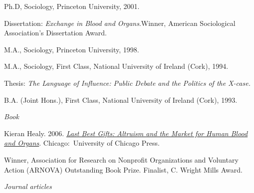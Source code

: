 \documentclass[11pt,article,oneside]{memoir}
\begin{document}

\ind Ph.D, Sociology, Princeton University, 2001.

\ind \hspace{0.35in} \footnotesize Dissertation: \emph{Exchange in Blood and Organs}.\newline Winner, American Sociological Association's Dissertation Award.\normalsize \vspace{0.05in}

\ind M.A., Sociology, Princeton University, 1998. 


\ind M.A., Sociology, First Class, National University of Ireland (Cork), 1994.

\ind \hspace{0.35in} \footnotesize Thesis: \emph{The Language of Influence: Public Debate and the Politics of the X-case.} \normalsize \vspace{0.01in}

\ind B.A. (Joint Hons.), First Class, National University of Ireland (Cork), 1993.

\bigskip
 
\medskip
\noindent\emph{Book \vspace{0.01in}}

\ind  Kieran Healy. 2006. \emph{\href{http://www.lastbestgifts.com}{Last Best Gifts: Altruism and the Market for Human Blood and Organs}}. Chicago:~University of Chicago Press. \vspace{0.05in}

\ind \hspace{0.35in} \footnotesize Winner, Association for Research on Nonprofit Organizations and Voluntary Action (ARNOVA) Outstanding Book Prize. Finalist, C. Wright Mills Award. 

\vspace{-0.075in}

\normalsize

\bigskip
\noindent\emph{Journal articles \vspace{0.05in}}
 
\end{document}
